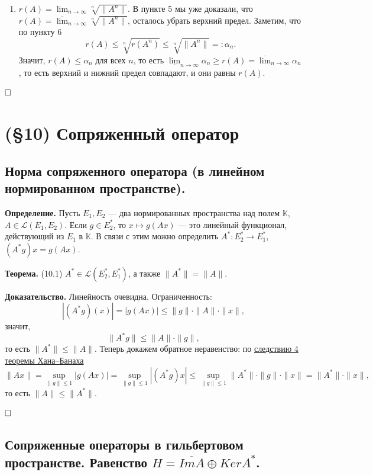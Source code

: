 \documentclass[12pt, a4paper]{article}
\newcommand{\QED}{$\hfill\square$}
\renewcommand{\le}{\leqslant}  %
\renewcommand{\ge}{\geqslant}  %
\begin{document}
\begin{enumerate}
    \item $r(A) = \lim_{n \to \infty} \sqrt[n]{\|A^n\|}$.
        В пункте 5 мы уже доказали, что $r(A) = \overline{\lim}_{n \to \infty} \sqrt[n]{\|A^n\|}$, осталось убрать верхний предел.
        Заметим, что по пункту 6
        \[
            r(A) \le \sqrt[n]{r(A^n)} \le \sqrt[n]{\|A^n\|} =: \alpha_n.
        \]
        Значит, $r(A) \le \alpha_n$ для всех $n$, то есть $\underline{\lim}_{n \to \infty} \alpha_n \ge r(A) = \overline{\lim}_{n \to \infty} \alpha_n$, то есть верхний и нижний предел совпадают, и они равны $r(A)$.
\end{enumerate}

\QED

\section{(§10) Сопряженный оператор}

\subsection{Норма сопряженного оператора (в линейном нормированном пространстве).}

\textbf{Определение.} Пусть $E_1, E_2$ --- два нормированных пространства над полем $\mathbb K$, $A \in \mathcal L(E_1, E_2)$.
Если $g \in E_2^*$, то $x \mapsto g(Ax)$ --- это линейный функционал, действующий из $E_1$ в $\mathbb K$.
В связи с этим можно определить $A^*: E_2^* \to E_1^*$, $(A^* g) x = g(Ax)$.

 \label{th:10-1} \textbf{Теорема.} (10.1) $A^* \in \mathcal L(E_2^*, E_1^*)$, а также $\|A^*\| = \|A\|$.

\textbf{Доказательство.} Линейность очевидна.
Ограниченность:
\[
    |(A^* g)(x)| = |g(Ax)| \le \|g\| \cdot \|A\| \cdot \|x\|,
\]
значит,
\[
    \|A^* g\| \le \|A\| \cdot \|g\|,
\]
то есть $\|A^*\| \le \|A\|$.
Теперь докажем обратное неравенство: по \hyperref[th:hahn-banach-coll-4]{следствию 4 теоремы Хана--Банаха}
\[
    \|Ax\| = \sup_{\|g\| \le 1} |g(Ax)| = \sup_{\|g\| \le 1} |(A^* g) x| \le \sup_{\|g\| \le 1} \|A^*\| \cdot \|g\| \cdot \|x\| = \|A^*\| \cdot \|x\|,
\]
то есть $\|A\| \le \|A^*\|$.

\QED



\subsection{Сопряженные операторы в гильбертовом пространстве. Равенство \texorpdfstring{$H = \overline{Im A} \oplus Ker A^*$}{H = Im A (+) Ker A*}.}
\end{document}

